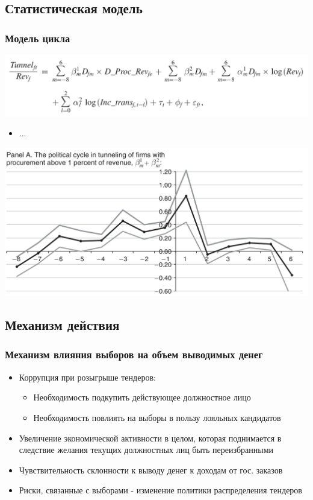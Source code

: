 \subsection{Статистическая модель}
\begin{frame}
\frametitle{Модель цикла}

\includegraphics[scale=0.18]{images/cycle1}
\begin{itemize}
\item ...
\end{itemize}
\end{frame}

\begin{frame}
\includegraphics[scale=0.2]{images/el_effect_1}

\end{frame}

\subsection{Механизм действия}

\begin{frame}
\frametitle{Механизм влияния выборов на объем выводимых денег}
\begin{itemize}
\item Коррупция при розыгрыше тендеров:
	\begin{itemize}
	\item Необходимость подкупить действующее должностное лицо
	\item Необходимость повлиять на выборы в пользу лояльных кандидатов
	\end{itemize}

\item Увеличение экономической активности в целом, которая поднимается в следствие желания текущих должностных лиц быть переизбранными

\item Чувствительность склонности к выводу денег к доходам от гос. заказов

\item Риски, связанные с выборами - изменение политики распределения тендеров
\end{itemize}
\end{frame}
